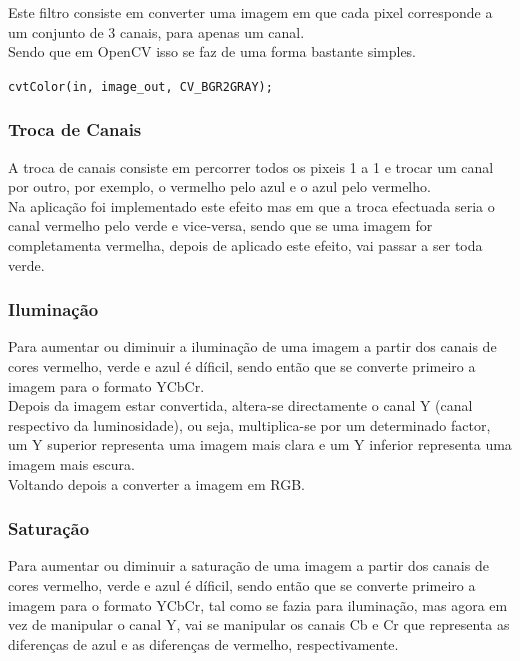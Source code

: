 \documentclass[portugues,final]{revdetua}
\begin{document}
Este filtro consiste em converter uma imagem em que cada pixel corresponde a um conjunto de 3 canais, para apenas um canal.\\

Sendo que em OpenCV isso se faz de uma forma bastante simples.

{\tt cvtColor(in, image\_out, CV\_BGR2GRAY);}

\subsubsection{Troca de Canais}

A troca de canais consiste em percorrer todos os pixeis 1 a 1 e trocar um canal por outro, por exemplo, o vermelho pelo azul e o azul pelo vermelho.\\

Na aplicação foi implementado este efeito mas em que a troca efectuada seria o canal vermelho pelo verde e vice-versa, sendo que se uma imagem for completamenta vermelha, depois de aplicado este efeito, vai passar a ser toda verde.

\subsubsection{Iluminação}

Para aumentar ou diminuir a iluminação de uma imagem a partir dos canais de cores vermelho, verde e azul é díficil, sendo então que se converte primeiro a imagem para o formato YCbCr.\\

Depois da imagem estar convertida, altera-se directamente o canal Y (canal respectivo da luminosidade), ou seja, multiplica-se por um determinado factor, um Y superior representa uma imagem mais clara e um Y inferior representa uma imagem mais escura.\\

Voltando depois a converter a imagem em RGB.

\subsubsection{Saturação}

Para aumentar ou diminuir a saturação de uma imagem a partir dos canais de cores vermelho, verde e azul é díficil, sendo então que se converte primeiro a imagem para o formato YCbCr, tal como se fazia para iluminação, mas agora em vez de manipular o canal Y, vai se manipular os canais Cb e Cr que representa as diferenças de azul e as diferenças de vermelho, respectivamente.
\end{document}
